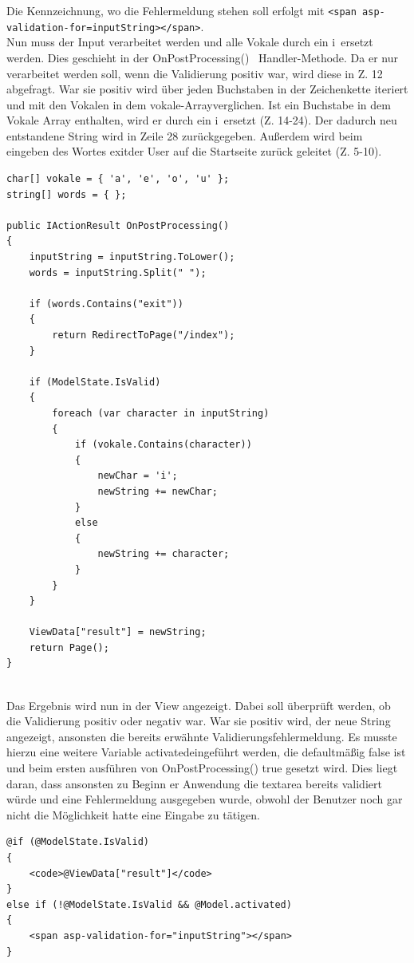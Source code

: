 \documentclass[a4paper,
12pt,
oneside]
{article}
\begin{document}
	Die Kennzeichnung, wo die Fehlermeldung stehen soll erfolgt mit \texttt{<span asp-validation-for=\glqq inputString\grqq></span>}. \\
	Nun muss der Input verarbeitet werden und alle Vokale durch ein \glqq i\grqq~ersetzt werden. Dies geschieht in der \glqq OnPostProcessing() \grqq~Handler-Methode. Da er nur verarbeitet werden soll, wenn die Validierung positiv war, wird diese in Z. 12 abgefragt. War sie positiv wird über jeden Buchstaben in der Zeichenkette iteriert und mit den Vokalen in dem \glqq vokale-Array\grqq verglichen. Ist ein Buchstabe in dem Vokale Array enthalten, wird er durch ein \glqq i\grqq~ersetzt (Z. 14-24). Der dadurch neu entstandene String wird in Zeile 28 zurückgegeben. Außerdem wird beim eingeben des Wortes \glqq exit\grqq der User auf die Startseite zurück geleitet (Z. 5-10).
	\lstset{style=csharp}
	\begin{lstlisting}
char[] vokale = { 'a', 'e', 'o', 'u' };
string[] words = { };

public IActionResult OnPostProcessing()
{
	inputString = inputString.ToLower();
	words = inputString.Split(" ");
	
	if (words.Contains("exit"))
	{
		return RedirectToPage("/index");
	}
	
	if (ModelState.IsValid)
	{
		foreach (var character in inputString)
		{
			if (vokale.Contains(character))
			{
				newChar = 'i';
				newString += newChar;
			}
			else
			{
				newString += character;
			}
		}
	}
	
	ViewData["result"] = newString;
	return Page();
}
	\end{lstlisting} ~\\
	Das Ergebnis wird nun in der View angezeigt. Dabei soll überprüft werden, ob die Validierung positiv oder negativ war. War sie positiv wird, der neue String angezeigt, ansonsten die bereits erwähnte Validierungsfehlermeldung. Es musste hierzu eine weitere Variable \glqq activated\grqq eingeführt werden, die defaultmäßig false ist und beim ersten ausführen von OnPostProcessing() true gesetzt wird. Dies liegt daran, dass ansonsten zu Beginn er Anwendung die textarea bereits validiert würde und eine Fehlermeldung ausgegeben wurde, obwohl der Benutzer noch gar nicht die Möglichkeit hatte eine Eingabe zu tätigen.
	\lstset{style=cshtml}
	\begin{lstlisting}
@if (@ModelState.IsValid)
{
	<code>@ViewData["result"]</code>
}
else if (!@ModelState.IsValid && @Model.activated)
{
	<span asp-validation-for="inputString"></span>
}
	\end{lstlisting} ~\\
	
\end{document}
